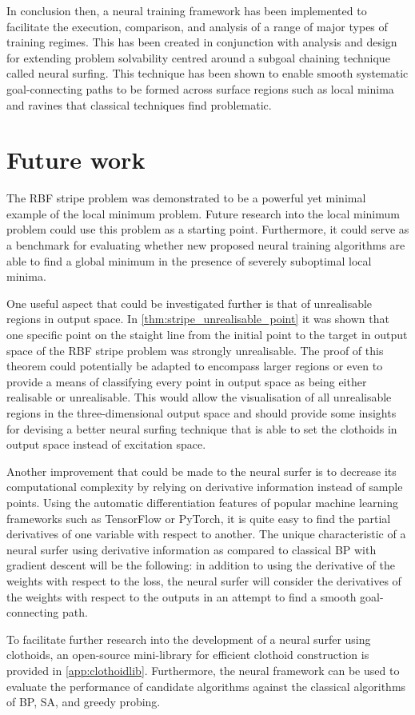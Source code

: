 In conclusion then, a neural training framework has been implemented to facilitate the execution, comparison, and analysis of a range of major types of training regimes.
This has been created in conjunction with analysis and design for extending problem solvability centred around a subgoal chaining technique called neural surfing.
This technique has been shown to enable smooth systematic goal-connecting paths to be formed across surface regions such as local minima and ravines that classical techniques find problematic.

\section{Future work}
\label{sec:future_work}
The RBF stripe problem was demonstrated to be a powerful yet minimal example of the local minimum problem. 
Future research into the local minimum problem could use this problem as a starting point.
Furthermore, it could serve as a benchmark for evaluating whether new proposed neural training algorithms are able to find a global minimum in the presence of severely suboptimal local minima.

One useful aspect that could be investigated further is that of unrealisable regions in output space.
In \ref{thm:stripe_unrealisable_point} it was shown that one specific point on the staight line from the initial point to the target in output space of the RBF stripe problem was strongly unrealisable.
The proof of this theorem could potentially be adapted to encompass larger regions or even to provide a means of classifying every point in output space as being either realisable or unrealisable.
This would allow the visualisation of all unrealisable regions in the three-dimensional output space and should provide some insights for devising a better neural surfing technique that is able to set the clothoids in output space instead of excitation space.

Another improvement that could be made to the neural surfer is to decrease its computational complexity by relying on derivative information instead of sample points.
Using the automatic differentiation features of popular machine learning frameworks such as TensorFlow or PyTorch, it is quite easy to find the partial derivatives of one variable with respect to another.
The unique characteristic of a neural surfer using derivative information as compared to classical BP with gradient descent will be the following:
in addition to using the derivative of the weights with respect to the loss, the neural surfer will consider the derivatives of the weights with respect to the outputs in an attempt to find a smooth goal-connecting path.

To facilitate further research into the development of a neural surfer using clothoids, an open-source mini-library for efficient clothoid construction is provided in \ref{app:clothoidlib}.
Furthermore, the neural framework can be used to evaluate the performance of candidate algorithms against the classical algorithms of BP, SA, and greedy probing.
